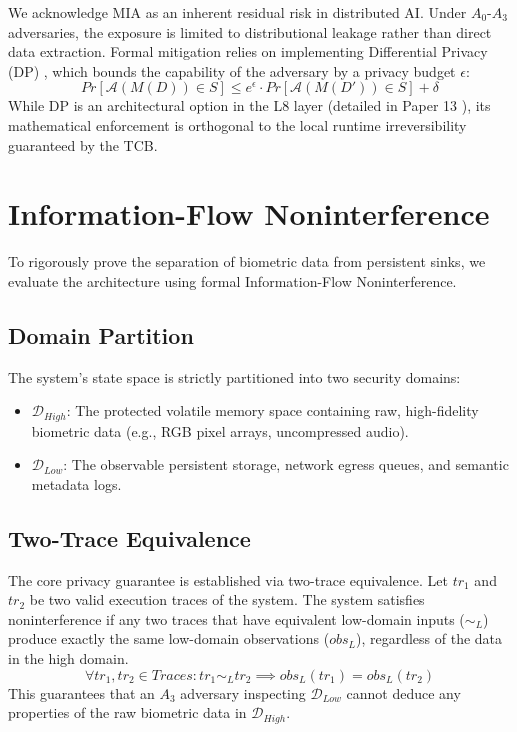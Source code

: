 \documentclass[conference]{IEEEtran}
\begin{document}
We acknowledge MIA as an inherent residual risk in distributed AI. Under $A_0$-$A_3$ adversaries, the exposure is limited to distributional leakage rather than direct data extraction. Formal mitigation relies on implementing Differential Privacy (DP) \cite{b14, b22}, which bounds the capability of the adversary by a privacy budget $\epsilon$:
\begin{equation}
Pr[\mathcal{A}(M(D)) \in S] \le e^\epsilon \cdot Pr[\mathcal{A}(M(D')) \in S] + \delta
\end{equation}
While DP is an architectural option in the L8 layer (detailed in Paper 13 \cite{P13}), its mathematical enforcement is orthogonal to the local runtime irreversibility guaranteed by the TCB.

\section{Information-Flow Noninterference}

To rigorously prove the separation of biometric data from persistent sinks, we evaluate the architecture using formal Information-Flow Noninterference.

\subsection{Domain Partition}
The system's state space is strictly partitioned into two security domains:
\begin{itemize}
    \item $\mathcal{D}_{High}$: The protected volatile memory space containing raw, high-fidelity biometric data (e.g., RGB pixel arrays, uncompressed audio).
    \item $\mathcal{D}_{Low}$: The observable persistent storage, network egress queues, and semantic metadata logs.
\end{itemize}



\subsection{Two-Trace Equivalence}
The core privacy guarantee is established via two-trace equivalence. Let $tr_1$ and $tr_2$ be two valid execution traces of the system. The system satisfies noninterference if any two traces that have equivalent low-domain inputs ($\sim_L$) produce exactly the same low-domain observations ($obs_L$), regardless of the data in the high domain.
\begin{equation}
\forall tr_1, tr_2 \in Traces : tr_1 \sim_L tr_2 \implies obs_L(tr_1) = obs_L(tr_2)
\end{equation}
This guarantees that an $A_3$ adversary inspecting $\mathcal{D}_{Low}$ cannot deduce any properties of the raw biometric data in $\mathcal{D}_{High}$.
\end{document}

